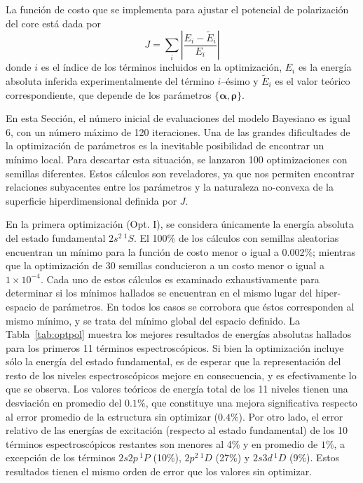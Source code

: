 La función de costo que se implementa para ajustar el potencial de 
polarización del core está dada por 
\begin{equation}
J=\sum_{i} \left|\frac{E_{i}-\tilde{E}_{i}}{E_{i}} \right|
\label{eq:Jpol}
\end{equation}
donde $i$ es el índice de los términos incluidos en la optimización, 
$E_{i}$ es la energía absoluta inferida experimentalmente del 
término $i$--ésimo y $\tilde{E}_{i}$ es el valor teórico correspondiente, 
que depende de los parámetros $\{\boldsymbol\alpha,\boldsymbol\rho\}$.

En esta Sección, el número inicial de evaluaciones del modelo Bayesiano 
es igual 6, con un número máximo de 120 iteraciones. Una de las grandes 
dificultades de la optimización de parámetros es la inevitable 
posibilidad de encontrar un mínimo local. Para descartar esta situación, 
se lanzaron 100 optimizaciones con semillas diferentes. Estos cálculos 
son reveladores, ya que nos permiten encontrar relaciones subyacentes 
entre los parámetros y la naturaleza no-convexa de la superficie 
hiperdimensional definida por $J$.

En la primera optimización (Opt. I), se considera únicamente la energía
absoluta del estado fundamental $2s^2\,^1S$. El 100\% de los cálculos 
con semillas aleatorias encuentran un mínimo para la función de costo 
menor o igual a 0.002\%; mientras que la optimización de 30 semillas 
conducieron a un costo menor o igual a $1\times 10^{-4}$. Cada uno de
estos cálculos es examinado exhaustivamente para determinar si los 
mínimos hallados se encuentran en el mismo lugar del hiper-espacio de 
parámetros. En todos los casos se corrobora que éstos corresponden al 
mismo mínimo, y se trata del mínimo global del espacio definido. La 
Tabla~\ref{tab:optpol} muestra los mejores resultados de energías 
absolutas hallados para los primeros 11 términos espectroscópicos. 
Si bien la optimización incluye sólo la energía del estado fundamental, 
es de esperar que la representación del resto de los niveles 
espectroscópicos mejore en consecuencia, y es efectivamente lo que se 
observa. Los valores teóricos de energía total de los 11 niveles tienen
una desviación en promedio del $0.1\%$, que constituye una mejora 
significativa respecto al error promedio de la estructura sin optimizar
($0.4\%$).
Por otro lado, el error relativo de las energías de excitación (respecto 
al estado fundamental) de los 10 términos espectroscópicos restantes 
son menores al 4\% y en promedio de $1\%$, a excepción de los términos 
$2s2p\,^1P$ (10\%), $2p^2\,^1D$ (27\%) y $2s3d\,^1D$ (9\%). Estos 
resultados tienen el mismo orden de error que los valores sin optimizar.


